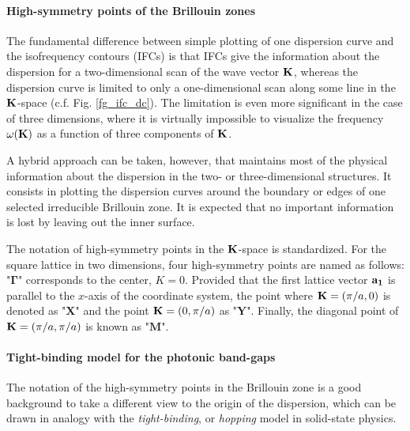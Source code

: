 \paragraph{High-symmetry points of the Brillouin zones} %
The fundamental difference between simple plotting of one dispersion curve and the isofrequency contours (IFCs) is that IFCs give the information about the dispersion for a two-dimensional scan of the wave vector ${\mathbf{K}}$, whereas the dispersion curve is limited to only a one-dimensional scan along some line in the ${\mathbf{K}}$-space (c.f. Fig. \ref{fg_ifc_dc}). The limitation is even more significant in the case of three dimensions, where it is virtually impossible to visualize the frequency $\omega({\mathbf{K}})$ as a function of three components of ${\mathbf{K}}$.

A hybrid approach can be taken, however, that maintains most of the physical information about the dispersion in the two- or three-dimensional structures. It consists in plotting the  dispersion curves around the boundary or edges of one selected irreducible Brillouin zone. It is expected that no important information is lost by leaving out the inner surface.

The notation of high-symmetry points in the ${\mathbf{K}}$-space is standardized. For the square lattice in two dimensions, four high-symmetry points are named as follows: "$\mathbf{\Gamma}$" corresponds to the center, $K=0$. Provided that the first lattice vector ${\mathbf{a_1}}$ is parallel to the $x$-axis of the coordinate system, the point where ${\mathbf{K}} = (\pi/a, 0)$ is denoted as  "$\mathbf{X}$" and the point ${\mathbf{K}} = (0, \pi/a)$ as		"$\mathbf{Y}$". Finally, the diagonal point of ${\mathbf{K}} = (\pi/a, \pi/a)$ is known as "$\mathbf{M}$".

\paragraph{Tight-binding model for the photonic band-gaps} %
The notation of the high-symmetry points in the Brillouin zone is a good background to take  a different view to the origin of the dispersion, which can be drawn in analogy with the \textit{tight-binding},   %
or \textit{hopping}  %
model in solid-state physics. 

